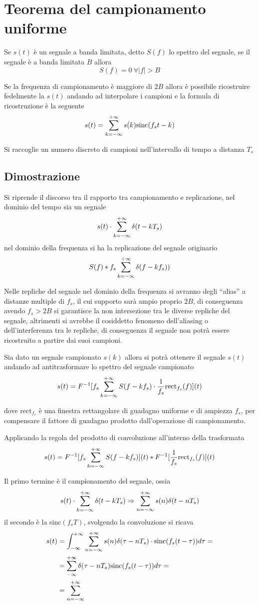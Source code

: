 \chapter{Teorema del campionamento uniforme}

Se $s(t)$ è un segnale a banda limitata, detto $S(f)$ lo spettro del segnale,
se il segnale è a banda limitata $B$ allora
$$
S(f) = 0 \ \forall|f| > B
$$

Se la frequenza di campionamento è maggiore di $2B$ allora è possibile
ricostruire fedelmente la $s(t)$ andando ad interpolare i campioni
e la formula di ricostruzione è la seguente
$$
s(t) = \sum_{k=-\infty}^{+\infty} s(k) \text{sinc}(f_st-k)
$$


Si raccoglie un numero discreto di campioni nell'intervallo di tempo a distanza
$T_s$

\section{Dimostrazione}
Si riprende il discorso tra il rapporto tra campionamento e replicazione, nel
dominio del tempo sia un segnale
$$
s(t) \cdot \sum_{k=-\infty}^{+\infty} \delta(t - kT_s)
$$
nel dominio della frequenza si ha la replicazione del segnale originario
$$
S(f) \ast f_s \sum_{k=-\infty}^{+\infty} \delta(f-kf_s))
$$

Nelle repliche del segnale nel dominio della frequenza si avranno degli
``alias'' a distanze multiple di $f_s$, il cui supporto sarà ampio proprio
$2B$, di conseguenza avendo $f_s>2B$ si garantisce la non intersezione tra le
diverse repliche del segnale, altrimenti si avrebbe il cosiddetto fenomeno
dell'aliasing o dell'interferenza tra le repliche, di conseguenza il segnale
non potrà essere ricostruito a partire dai suoi campioni.



Sia dato un segnale campionato $s(k)$ allora si potrà ottenere il segnale
$s(t)$ andando ad antitrasformare lo spettro del segnale campionato
$$
s(t) = F^{-1} [ f_s \sum_{k=-\infty}^{+\infty} S(f-kf_s)\cdot \frac{1}{f_s} \text{rect}_{f_s}(f)
](t)
$$

dove $\text{rect}_{f_s}$ è una finestra rettangolare di guadagno uniforme e di
ampiezza $f_s$, per compensare il fattore di guadagno prodotto dall'operazione
di campionamento.

Applicando la regola del prodotto di convoluzione all'interno della trasformata
$$
s(t) = F^{-1} [ f_s \sum_{k=-\infty}^{+\infty} S(f-kf_s) ](t) \ast F^{-1} [ \frac{1}{f_s}
\text{rect}_{f_s}(f)
](t)
$$

Il primo termine è il campionamento del segnale, ossia
$$
s(t)\cdot \sum_{k=-\infty}^{+\infty}\delta(t-kT_s) \Rightarrow \sum_{n=-\infty}^{+\infty} s(n)
\delta(t-nT_s)
$$
il secondo è la sinc$(f_sT)$, svolgendo la convoluzione si ricava
$$\begin{aligned}
s(t) &= \int_{-\infty}^{+\infty} \sum_{n=-\infty}^{+\infty} s(n) \delta(\tau - nT_s) \cdot
\text{sinc}(f_s(t-\tau))d\tau = \\
&= \sum_{-\infty}^{+\infty} \delta(\tau - nT_s) \text{sinc}(f_s(t-\tau))d\tau
=\\
&= \sum_{n=-\infty}^{+\infty}
\end{aligned}
$$



